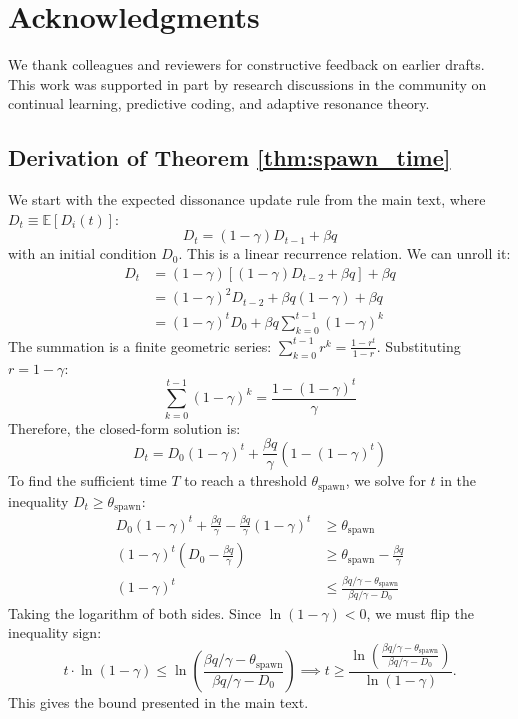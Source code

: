 \documentclass{article}
\numberwithin{figure}{section}
\numberwithin{table}{section}
\numberwithin{algorithm}{section}
\begin{document}
\section*{Acknowledgments}
We thank colleagues and reviewers for constructive feedback on earlier drafts. This work was supported in part by research discussions in the community on continual learning, predictive coding, and adaptive resonance theory.

\begin{appendices}

\section{Derivation of Theorem \ref{thm:spawn_time}}
We start with the expected dissonance update rule from the main text, where $D_t \equiv \mathbb{E}[D_i(t)]$:
\begin{equation}
D_t = (1-\gamma)D_{t-1} + \beta q
\end{equation}
with an initial condition $D_0$. This is a linear recurrence relation. We can unroll it:
\begin{align*}
D_t &= (1-\gamma) \left[ (1-\gamma)D_{t-2} + \beta q \right] + \beta q \\
    &= (1-\gamma)^2 D_{t-2} + \beta q (1-\gamma) + \beta q \\
    &= (1-\gamma)^t D_0 + \beta q \sum_{k=0}^{t-1} (1-\gamma)^k
\end{align*}
The summation is a finite geometric series: $\sum_{k=0}^{t-1} r^k = \frac{1-r^t}{1-r}$. Substituting $r = 1-\gamma$:
\begin{equation}
\sum_{k=0}^{t-1} (1-\gamma)^k = \frac{1 - (1-\gamma)^t}{\gamma}
\end{equation}
Therefore, the closed-form solution is:
\begin{equation}
D_t = D_0(1-\gamma)^t + \frac{\beta q}{\gamma} \left(1-(1-\gamma)^t\right)
\end{equation}
To find the sufficient time $T$ to reach a threshold $\theta_{\text{spawn}}$, we solve for $t$ in the inequality $D_t \ge \theta_{\text{spawn}}$:
\begin{align*}
D_0(1-\gamma)^t + \frac{\beta q}{\gamma} - \frac{\beta q}{\gamma}(1-\gamma)^t &\ge \theta_{\text{spawn}} \\
(1-\gamma)^t \left(D_0 - \frac{\beta q}{\gamma}\right) &\ge \theta_{\text{spawn}} - \frac{\beta q}{\gamma} \\
(1-\gamma)^t &\le \frac{\beta q/\gamma - \theta_{\text{spawn}}}{\beta q/\gamma - D_0}
\end{align*}
Taking the logarithm of both sides. Since $\ln(1-\gamma) < 0$, we must flip the inequality sign:
\begin{equation*}
t \cdot \ln(1-\gamma) \le \ln\left(\frac{\beta q/\gamma - \theta_{\text{spawn}}}{\beta q/\gamma - D_0}\right) \implies t \ge \frac{\ln\left(\frac{\beta q/\gamma - \theta_{\text{spawn}}}{\beta q/\gamma - D_0}\right)}{\ln(1-\gamma)}.
\end{equation*}
This gives the bound presented in the main text.


\end{appendices}
\end{document}
